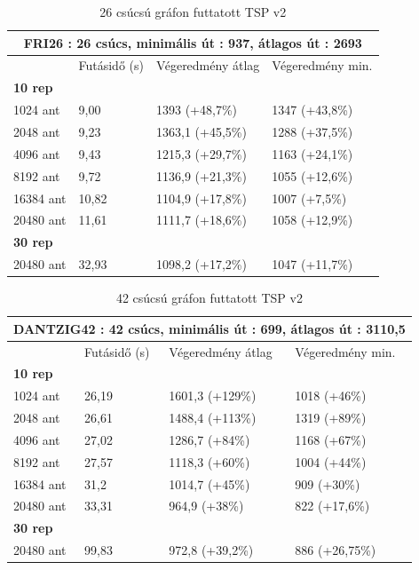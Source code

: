 \begin{table}[ht!]
	\centering
	\begin{tabular}{|p{2cm}||p{3cm}|p{3.5cm}|p{3.5cm}|}
		\hline
		\multicolumn{4}{|c|}{FRI26 : 26 csúcs, minimális út : 937, átlagos út : 2693} \\
		\hline
		& Futásidő (s) & Végeredmény átlag & Végeredmény min.\\
		\hline
		\textbf{10 rep} & & & \\
		1024 ant & 9,00 & 1393 (+48,7\%) & 1347 (+43,8\%)\\
		2048 ant & 9,23 & 1363,1 (+45,5\%) & 1288 (+37,5\%)\\
		4096 ant & 9,43 & 1215,3 (+29,7\%)& 1163 (+24,1\%)\\
		8192 ant & 9,72 & 1136,9 (+21,3\%) & 1055 (+12,6\%)\\
		16384 ant & 10,82 & 1104,9 (+17,8\%) & 1007 (+7,5\%) \\
		20480 ant & 11,61 & 1111,7 (+18,6\%) & 1058 (+12,9\%) \\
		\hline
		\textbf{30 rep} & & & \\
		20480 ant & 32,93 & 1098,2 (+17,2\%) & 1047 (+11,7\%) \\
		\hline
	\end{tabular}
	\caption{26 csúcsú gráfon futtatott TSP v2}
	\label{table:TSPv2_26}
\end{table}

\begin{table}[ht!]
	\centering
	\begin{tabular}{|p{2cm}||p{3cm}|p{3.5cm}|p{3.5cm}|}
		\hline
		\multicolumn{4}{|c|}{DANTZIG42 : 42 csúcs, minimális út : 699, átlagos út : 3110,5} \\
		\hline
		& Futásidő (s) & Végeredmény átlag & Végeredmény min.\\
		\hline
		\textbf{10 rep} & & & \\
		1024 ant & 26,19 & 1601,3 (+129\%) & 1018 (+46\%)\\
		2048 ant & 26,61 & 1488,4 (+113\%) & 1319 (+89\%) \\
		4096 ant & 27,02 & 1286,7 (+84\%) & 1168 (+67\%)\\
		8192 ant & 27,57 & 1118,3 (+60\%) & 1004 (+44\%) \\
		16384 ant & 31,2 & 1014,7 (+45\%) & 909 (+30\%)\\
		20480 ant & 33,31 & 964,9 (+38\%) & 822 (+17,6\%) \\
		\hline
		\textbf{30 rep} & & & \\
		20480 ant & 99,83 & 972,8 (+39,2\%) & 886 (+26,75\%) \\
		\hline
	\end{tabular}
	\caption{42 csúcsú gráfon futtatott TSP v2}
	\label{table:TSPv2_42}
\end{table}


